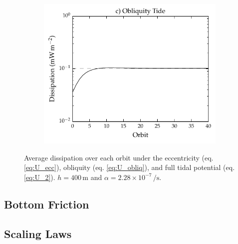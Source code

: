 \begin{figure}[!t]
\begin{subfigure}{\linewidth}
\includegraphics[width=0.85\linewidth]{Figures/obliq_diss}
\subcaption{\label{fig:diss_c}}
\end{subfigure}
\vspace*{-0.8cm}
\caption{Average dissipation over each orbit under the eccentricity (eq. \ref{eq:U_ecc}), obliquity (eq. \ref{eq:U_obliq}), and full tidal potential (eq. \ref{eq:U_2}). $h = 400 \, \si{\metre}$ and $\alpha = 2.28 \times 10^{-7} \, \si{\per\second}$.\label{fig:diss}}
\end{figure}




\subsection{Bottom Friction \label{subsec:result_bottom}}

\subsection{Scaling Laws \label{subsec:scaling}}